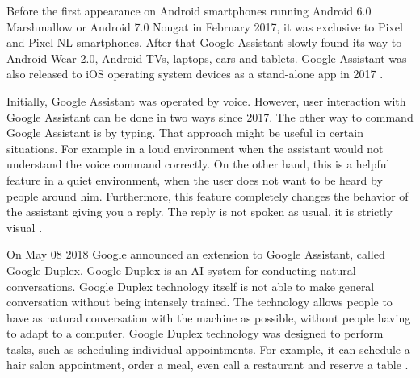 \documentclass[
  digital, %
  oneside, %
  table,   %
  lof,     %
  lot,     %
]{fithesis3}
\begin{document}
Before the first appearance on Android smartphones running Android 6.0 Marshmallow or Android 7.0 Nougat in February 2017, it was exclusive to Pixel and Pixel NL smartphones. After that Google Assistant slowly found its way to Android Wear 2.0, Android TVs, laptops, cars and tablets. Google Assistant was also released to iOS operating system devices as a stand-alone app in 2017 \parencite{google_ios}.

Initially, Google Assistant was operated by voice. However, user interaction with Google Assistant can be done in two ways since 2017. The other way to command Google Assistant is by typing. That approach might be useful in certain situations. For example in a loud environment when the assistant would not understand the voice command correctly. On the other hand, this is a helpful feature in a quiet environment, when the user does not want to be heard by people around him. Furthermore, this feature completely changes the behavior of the assistant giving you a reply. The reply is not spoken as usual, it is strictly visual \parencite{google_type}.

On May 08 2018 Google announced an extension to Google Assistant, called Google Duplex. Google Duplex is an AI system for conducting natural conversations. Google Duplex technology itself is not able to make general conversation without being intensely trained. The technology allows people to have as natural conversation with the machine as possible, without people having to adapt to a computer. Google Duplex technology was designed to perform tasks, such as scheduling individual appointments. For example, it can schedule a hair salon appointment, order a meal, even call a restaurant and reserve a table \parencite{google_duplex}.
\end{document}
